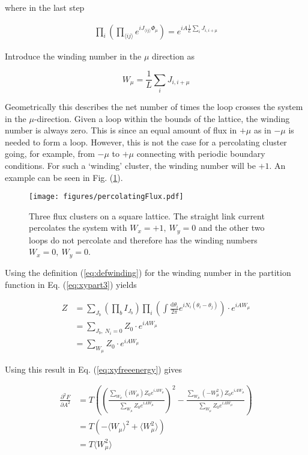 \noindent where in the last step

\begin{align}
    \prod_i \left (\prod_{\langle ij \rangle} e^{i J_{\langle ij \rangle} \Phi_\mu} \right) = e^{iA \frac{1}{L} \sum_i J_{i, i+\mu}}   
\end{align}

Introduce the winding number in the $\mu$ direction as

\begin{equation}
    W_\mu = \frac{1}{L} \sum_i J_{i, i+\mu}
\label{eq:defwinding}
\end{equation}

Geometrically this describes the net number of times the loop crosses the system in the $\mu$-direction. Given a loop within the bounds of the lattice, the winding number is always zero. This is since an equal amount of flux in $+\mu$ as in $-\mu$ is needed to form a loop. However, this is not the case for a percolating cluster going, for example, from $-\mu$ to $+\mu$ connecting with periodic boundary conditions. For such a `winding' cluster, the winding number will be $+1$. An example can be seen in Fig. (\ref{fig:fluxpercolation}).

\begin{figure}[h!]
    \centering
        \texttt{[image: figures/percolatingFlux.pdf]}
    \caption{Three flux clusters on a square lattice. The straight link current percolates the system with $W_x = +1, \ W_y = 0$ and the other two loops do not percolate and therefore has the winding numbers $W_x = 0, \ W_y = 0$.}
    \label{fig:fluxpercolation}
\end{figure}

Using the definition (\ref{eq:defwinding}) for the winding number in the partition function in Eq. (\ref{eq:xypart3}) yields

\begin{align}
    Z &= \sum_{J_b} \left ( \prod_b I_{J_b} \right ) \prod_i \left ( \int \frac{\mathrm d \theta_i}{2 \pi} e^{i N_i (\theta_i - \theta_j)} \right ) \cdot e^{i A W_\mu} \\
    &= \sum_{J_b, \ N_i = 0} Z_0 \cdot e^{i A W_\mu} \\
    &= \sum_{W_\mu} Z_0 \cdot e^{i A W_\mu}
\end{align}

Using this result in Eq. (\ref{eq:xyfreeenergy}) gives

\begin{align}
    \frac{\partial^2 F}{\partial A^2} &= T \left ( \left ( \frac{\sum_{W_\mu} (i W_\mu) Z_0 e^{iAW_\mu}}{\sum_{W_\mu} Z_0 e^{iAW_\mu}} \right )^2 - \frac{\sum_{W_\mu} (- W_\mu^2) Z_0 e^{iAW_\mu}}{\sum_{W_\mu} Z_0 e^{iAW_\mu}} \right ) \\
%
    &= T \left ( -\langle W_\mu \rangle^2 + \langle W_\mu^2 \rangle \right ) \\
%
    &= T \langle W_\mu^2 \rangle
\end{align}


